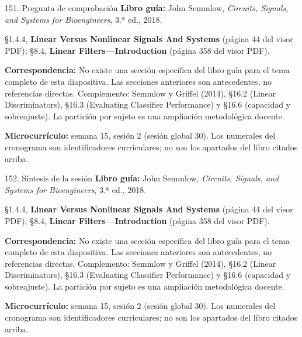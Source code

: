 \documentclass[
  10pt,
  ignorenonframetext,
  aspectratio=169,
  spanish,
]{beamer}
\begin{document}
\begin{frame}{151. Pregunta de comprobación}
\label{pregunta-de-comprobaciuxf3n-9}
\textbf{Libro guía:} John Semmlow, \emph{Circuits, Signals, and Systems
for Bioengineers}, 3.ª ed., 2018.

§1.4.4, \textbf{Linear Versus Nonlinear Signals And Systems} (página 44
del visor PDF); §8.4, \textbf{Linear Filters---Introduction} (página 358
del visor PDF).

\textbf{Correspondencia:} No existe una sección específica del libro
guía para el tema completo de esta diapositiva. Las secciones anteriores
son antecedentes, no referencias directas. Complemento: Semmlow y
Griffel (2014), §16.2 (Linear Discriminators), §16.3 (Evaluating
Classifier Performance) y §16.6 (capacidad y sobreajuste). La partición
por sujeto es una ampliación metodológica docente.

\textbf{Microcurrículo:} semana 15, sesión 2 (sesión global 30). Los
numerales del cronograma son identificadores curriculares; no son los
apartados del libro citados arriba.
\end{frame}

\begin{frame}{152. Síntesis de la sesión}
\label{suxedntesis-de-la-sesiuxf3n-9}
\textbf{Libro guía:} John Semmlow, \emph{Circuits, Signals, and Systems
for Bioengineers}, 3.ª ed., 2018.

§1.4.4, \textbf{Linear Versus Nonlinear Signals And Systems} (página 44
del visor PDF); §8.4, \textbf{Linear Filters---Introduction} (página 358
del visor PDF).

\textbf{Correspondencia:} No existe una sección específica del libro
guía para el tema completo de esta diapositiva. Las secciones anteriores
son antecedentes, no referencias directas. Complemento: Semmlow y
Griffel (2014), §16.2 (Linear Discriminators), §16.3 (Evaluating
Classifier Performance) y §16.6 (capacidad y sobreajuste). La partición
por sujeto es una ampliación metodológica docente.

\textbf{Microcurrículo:} semana 15, sesión 2 (sesión global 30). Los
numerales del cronograma son identificadores curriculares; no son los
apartados del libro citados arriba.
\end{frame}
\end{document}
